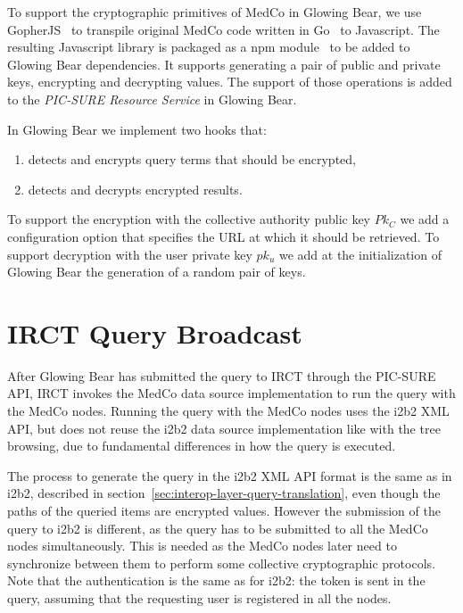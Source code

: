 To support the cryptographic primitives of MedCo in Glowing Bear, we use GopherJS~\cite{github:gopherjs} to transpile original MedCo code written in Go~\cite{golang} to Javascript.
The resulting Javascript library is packaged as a npm module~\cite{npm} to be added to Glowing Bear dependencies.
It supports generating a pair of public and private keys, encrypting and decrypting values.
The support of those operations is added to the \emph{PIC-SURE Resource Service} in Glowing Bear.

In Glowing Bear we implement two hooks that: 
\begin{enumerate}
    \setlength\itemsep{0em}
    \item detects and encrypts query terms that should be encrypted,
    \item detects and decrypts encrypted results.
\end{enumerate}
To support the encryption with the collective authority public key $Pk_C$ we add a configuration option that specifies the URL at which it should be retrieved.
To support decryption with the user private key $pk_u$ we add at the initialization of Glowing Bear the generation of a random pair of keys.


\section{IRCT Query Broadcast}

After Glowing Bear has submitted the query to IRCT through the PIC-SURE API, IRCT invokes the MedCo data source implementation to run the query with the MedCo nodes.
Running the query with the MedCo nodes uses the i2b2 XML API, but does not reuse the i2b2 data source implementation like with the tree browsing, due to fundamental differences in how the query is executed.

The process to generate the query in the i2b2 XML API format is the same as in i2b2, described in section~\ref{sec:interop-layer-query-translation}, even though the paths of the queried items are encrypted values.
However the submission of the query to i2b2 is different, as the query has to be submitted to all the MedCo nodes simultaneously.
This is needed as the MedCo nodes later need to synchronize between them to perform some collective cryptographic protocols.
Note that the authentication is the same as for i2b2: the token is sent in the query, assuming that the requesting user is registered in all the nodes.


